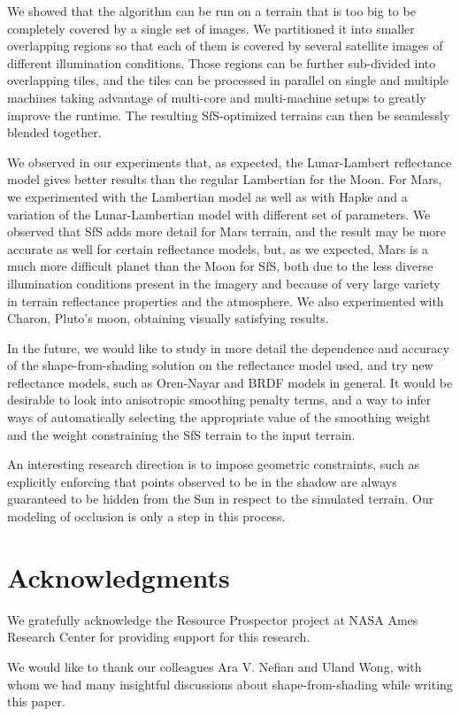 \documentclass[12pt,oneside]{article}
\renewcommand*{\bibname}{References}
\begin{document}
We showed that the algorithm can be run on a terrain that is too big to be
completely covered by a single set of images. We partitioned it
into smaller overlapping regions so that each of them is
covered by several satellite images of different illumination
conditions. Those regions can be further sub-divided into overlapping tiles,
and the tiles can be processed in parallel on single and multiple
machines taking advantage of multi-core and multi-machine setups
to greatly improve the runtime. The resulting SfS-optimized terrains can then be
seamlessly blended together. 

We observed in our experiments that, as expected, the Lunar-Lambert
reflectance model gives better results than the regular Lambertian for
the Moon. For Mars, we experimented with the Lambertian model as well as
with Hapke and a variation of the Lunar-Lambertian model with different
set of parameters.  We observed that SfS adds more detail for Mars
terrain, and the result may be more accurate as well for certain
reflectance models, but, as we expected, Mars is a much more difficult
planet than the Moon for SfS, both due to the less diverse illumination
conditions present in the imagery and because of very large variety in
terrain reflectance properties and the atmosphere. We also experimented
with Charon, Pluto's moon, obtaining visually satisfying results.

In the future, we would like to study in more detail the dependence and
accuracy of the shape-from-shading solution on the reflectance model
used, and try new reflectance models, such as Oren-Nayar and
BRDF models in general. It would be desirable to look into anisotropic
smoothing penalty terms, and a way to infer ways of automatically selecting the appropriate value of the
smoothing weight and the weight constraining the SfS terrain to the input terrain.

An interesting research direction is to impose geometric constraints,
such as explicitly enforcing that points observed to be in the shadow
are always guaranteed to be hidden from the Sun in respect to the
simulated terrain. Our modeling of occlusion is only a step in this
process.

\section{Acknowledgments}

We gratefully acknowledge the Resource Prospector project at NASA Ames
Research Center for providing support for this research.

We would like to thank our colleagues Ara V. Nefian and Uland Wong, with whom we had
many insightful discussions about shape-from-shading while writing this
paper.


\addcontentsline{toc}{chapter}{\bibname}

\end{document}
